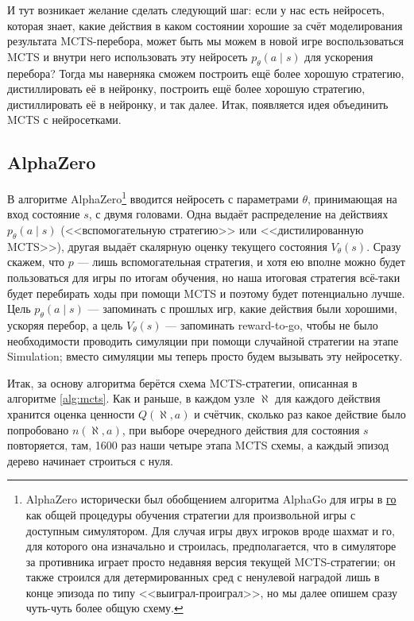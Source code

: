 И тут возникает желание сделать следующий шаг: если у нас есть нейросеть, которая знает, какие действия в каком состоянии хорошие за счёт моделирования результата MCTS-перебора, может быть мы можем в новой игре воспользоваться MCTS и внутри него использовать эту нейросеть $p_{\theta}(a \mid s)$ для ускорения перебора? Тогда мы наверняка сможем построить ещё более хорошую стратегию, дистиллировать её в нейронку, построить ещё более хорошую стратегию, дистиллировать её в нейронку, и так далее. Итак, появляется идея объединить MCTS с нейросетками.

\subsection{AlphaZero}

В алгоритме AlphaZero\footnote{AlphaZero исторически был обобщением алгоритма AlphaGo для игры в \href{https://ru.wikipedia.org/wiki/Го}{го} как общей процедуры обучения стратегии для произвольной игры с доступным симулятором. Для случая игры двух игроков вроде шахмат и го, для которого она изначально и строилась, предполагается, что в симуляторе за противника играет просто недавняя версия текущей MCTS-стратегии; он также строился для детермированных сред с ненулевой наградой лишь в конце эпизода по типу <<выиграл-проиграл>>, но мы далее опишем сразу чуть-чуть более общую схему.} вводится нейросеть с параметрами $\theta$, принимающая на вход состояние $s$, с двумя головами. Одна выдаёт распределение на действиях $p_{\theta}(a \mid s)$ (<<вспомогательную стратегию>> или <<дистилированную MCTS>>), другая выдаёт скалярную оценку текущего состояния $V_\theta(s)$. Сразу скажем, что $p$ --- лишь вспомогательная стратегия, и хотя ею вполне можно будет пользоваться для игры по итогам обучения, но наша итоговая стратегия всё-таки будет перебирать ходы при помощи MCTS и поэтому будет потенциально лучше. Цель $p_{\theta}(a \mid s)$ --- запоминать с прошлых игр, какие действия были хорошими, ускоряя перебор, а цель $V_{\theta}(s)$ --- запоминать reward-to-go, чтобы не было необходимости проводить симуляции при помощи случайной стратегии на этапе Simulation; вместо симуляции мы теперь просто будем вызывать эту нейросетку.

Итак, за основу алгоритма берётся схема MCTS-стратегии, описанная в алгоритме \ref{alg:mcts}. Как и раньше, в каждом узле $\aleph$ для каждого действия хранится оценка ценности $Q(\aleph, a)$ и счётчик, сколько раз какое действие было попробовано $n(\aleph, a)$, при выборе очередного действия для состояния $s$ повторяется, там, 1600 раз наши четыре этапа MCTS схемы, а каждый эпизод дерево начинает строиться с нуля. 

